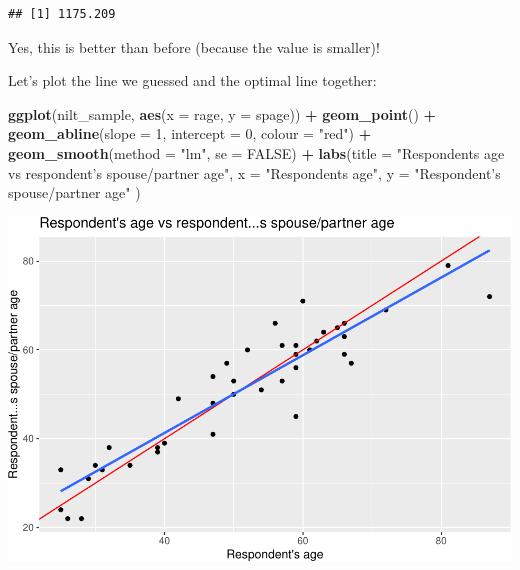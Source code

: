 \documentclass[
]{book}
\newenvironment{Shaded}{\begin{snugshade}}{\end{snugshade}}
\newcommand{\AttributeTok}[1]{\textcolor[rgb]{0.13,0.29,0.53}{#1}}
\newcommand{\ConstantTok}[1]{\textcolor[rgb]{0.56,0.35,0.01}{#1}}
\newcommand{\DecValTok}[1]{\textcolor[rgb]{0.00,0.00,0.81}{#1}}
\newcommand{\FunctionTok}[1]{\textcolor[rgb]{0.13,0.29,0.53}{\textbf{#1}}}
\newcommand{\NormalTok}[1]{#1}
\newcommand{\SpecialCharTok}[1]{\textcolor[rgb]{0.81,0.36,0.00}{\textbf{#1}}}
\newcommand{\StringTok}[1]{\textcolor[rgb]{0.31,0.60,0.02}{#1}}
\begin{document}
\begin{verbatim}
## [1] 1175.209
\end{verbatim}

Yes, this is better than before (because the value is smaller)!

Let's plot the line we guessed and the optimal line together:

\begin{Shaded}
\begin{Highlighting}[]
\FunctionTok{ggplot}\NormalTok{(nilt\_sample, }\FunctionTok{aes}\NormalTok{(}\AttributeTok{x =}\NormalTok{ rage, }\AttributeTok{y =}\NormalTok{ spage)) }\SpecialCharTok{+} 
  \FunctionTok{geom\_point}\NormalTok{() }\SpecialCharTok{+}
  \FunctionTok{geom\_abline}\NormalTok{(}\AttributeTok{slope =} \DecValTok{1}\NormalTok{, }\AttributeTok{intercept =} \DecValTok{0}\NormalTok{, }\AttributeTok{colour =} \StringTok{"red"}\NormalTok{) }\SpecialCharTok{+}
  \FunctionTok{geom\_smooth}\NormalTok{(}\AttributeTok{method =} \StringTok{"lm"}\NormalTok{, }\AttributeTok{se =} \ConstantTok{FALSE}\NormalTok{) }\SpecialCharTok{+}
   \FunctionTok{labs}\NormalTok{(}\AttributeTok{title =} \StringTok{"Respondent\textquotesingle{}s age vs respondent’s spouse/partner age"}\NormalTok{, }
       \AttributeTok{x =} \StringTok{"Respondent\textquotesingle{}s age"}\NormalTok{, }\AttributeTok{y =} \StringTok{"Respondent’s spouse/partner age"}\NormalTok{ )}
\end{Highlighting}
\end{Shaded}

\begin{flushleft}\includegraphics[width=1\linewidth]{lab-workbook_files/figure-latex/unnamed-chunk-93-1} \end{flushleft}
\end{document}
